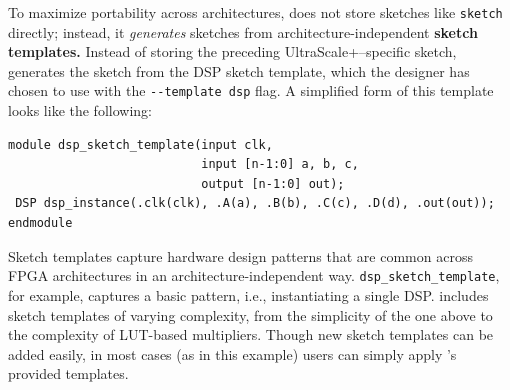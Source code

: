 To maximize portability across architectures,
  \lr does not store sketches 
  like \texttt{sketch}
  directly; 
  instead, it \textit{generates} sketches
  from architecture-independent
  \textbf{sketch templates.}
Instead of storing
  the preceding UltraScale+--specific sketch,
  \lr generates the sketch
  from the DSP sketch template, which
  the designer has chosen to use 
  with the \mbox{\texttt{-{}-template dsp}} flag.
A simplified form of this template looks like the following:
\begin{verbatim}
module dsp_sketch_template(input clk,
                           input [n-1:0] a, b, c,
                           output [n-1:0] out);
 DSP dsp_instance(.clk(clk), .A(a), .B(b), .C(c), .D(d), .out(out));
endmodule
\end{verbatim}
Sketch templates
  capture hardware design patterns
that are common across FPGA architectures
  in an
  architecture-independent way.
\texttt{dsp\_sketch\_template},
  for example, 
  captures
  a basic pattern, i.e., 
  instantiating a single DSP.
\lr includes 
  sketch templates of varying complexity,
  from the simplicity of the one above 
  to the complexity of LUT-based multipliers.
Though new sketch templates
  can be added easily,
  in most cases
  (as in this example)
  users can simply apply
  \lr's provided templates.

